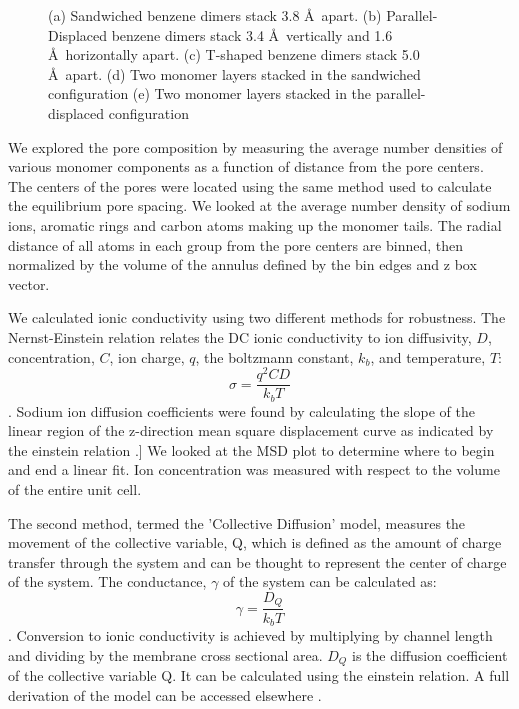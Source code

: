 \documentclass{article}
\newcommand{\angstrom}{\textup{\AA}}
\begin{document}
\begin{figure}
\begin{subfigure}[b]{0.475\textwidth}
		\caption{}\label{fig:offsetlayers}
	\end{subfigure}
	\caption{(a) Sandwiched benzene dimers stack 3.8 \angstrom~apart. (b) Parallel-Displaced benzene dimers stack
	3.4 \angstrom~vertically and 1.6 \angstrom~horizontally apart. (c) T-shaped benzene dimers stack 5.0 \angstrom~apart. 
	(d) Two monomer layers stacked in the sandwiched configuration (e) Two monomer layers stacked in the parallel-displaced
	configuration }\label{fig:stacking}
  \end{figure}
  
  We explored the pore composition by measuring the average number densities of
  various monomer components as a function of distance from the pore centers. The
  centers of the pores were located using the same method used to calculate the
  equilibrium pore spacing. We looked at the average number density of sodium
  ions, aromatic rings and carbon atoms making up the monomer tails. The radial
  distance of all atoms in each group from the pore centers are binned, then
  normalized by the volume of the annulus defined by the bin edges and z box
  vector.

  We calculated ionic conductivity using two different methods for robustness.
  The Nernst-Einstein relation relates the DC ionic conductivity to ion
  diffusivity, $D$, concentration, $C$, ion charge, $q$, the boltzmann constant,
  $k_b$, and temperature, $T$: $$\sigma = \dfrac{q^2CD}{k_b T}$$. 
  Sodium ion diffusion coefficients were found by calculating the slope
  of the linear region of the z-direction mean square displacement curve as
  indicated by the einstein relation \cite{einstein_investigations_1956}.] We
  looked at the MSD plot to determine where to begin and end a linear fit. Ion
  concentration was measured with respect to the volume of the entire unit cell. 

  The second method, termed the 'Collective Diffusion' model, measures the
  movement of the collective variable, Q, which is defined as the amount of
  charge transfer through the system and can be thought to represent the center
  of charge of the system. The conductance, $\gamma$ of the system can be
  calculated as: $$ \gamma = \dfrac{D_Q}{k_b T} $$. Conversion to ionic
  conductivity is achieved by multiplying by channel length and dividing by the
  membrane cross sectional area.  $D_Q$ is the diffusion coefficient of the
  collective variable Q. It can be calculated using the einstein relation.  A
  full derivation of the model can be accessed elsewhere 
  \cite{liu_collective_2013}.
\end{document}
